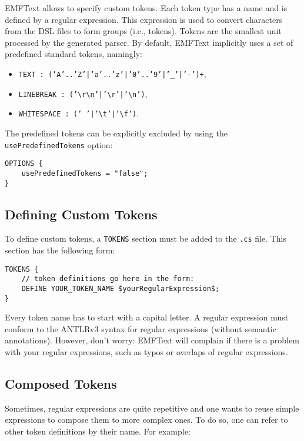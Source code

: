 EMFText allows to specify custom tokens. Each token type has a name and is
defined by a regular expression. This expression is used to convert characters 
from the DSL files to form groups (i.e., tokens). Tokens are the smallest unit
processed by the generated parser. By default, EMFText implicitly uses a set of
predefined standard tokens, namingly:

\begin{itemize}
  \item \texttt{TEXT : ('A'..'Z'|'a'..'z'|'0'..'9'|'\_'|'-')+},
  \item \texttt{LINEBREAK :
  ('\textbackslash{}r\textbackslash{}n'|'\textbackslash{}r'|'\textbackslash{}n')},
  \item \texttt{WHITESPACE : (' '|'\textbackslash{}t'|'\textbackslash{}f')}.
\end{itemize}

The predefined tokens can be explicitly excluded by using the 
\texttt{usePredefinedTokens} option:

\begin{lstlisting}
OPTIONS {
    usePredefinedTokens = "false";
}
\end{lstlisting}

\subsection{Defining Custom Tokens}

To define custom tokens, a \texttt{TOKENS} section must be added to the
\texttt{.cs} file. This section has the following form:

\begin{lstlisting}
TOKENS {
    // token definitions go here in the form:
    DEFINE YOUR_TOKEN_NAME $yourRegularExpression$;
}
\end{lstlisting}

Every token name has to start with a capital letter. A regular expression must
conform to the ANTLRv3 syntax for regular expressions (without semantic
annotations). However, don't worry: EMFText will complain if there is a problem
with your regular expressions, such as typos or overlaps of regular expressions.

\subsection{Composed Tokens}

Sometimes, regular expressions are quite repetitive and one wants to reuse 
simple expressions to compose them to more complex ones. To do so, one can refer 
to other token definitions by their name. For example:

